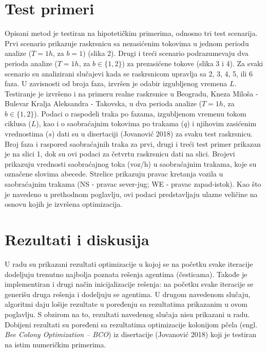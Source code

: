 \section{Test primeri}

Opisani metod je testiran na hipotetičkim primerima, odnosno tri test scenarija. Prvi scenario prikazuje raskrsnicu sa nezasićenim tokovima u jednom periodu analize ($T=1h$, za $b = 1$) (slika 2). Drugi i treći scenario podrazumevaju dva perioda analize ($T=1h$, za $b\in\{1,2\}$) za prezasićene tokove (slika 3 i 4). Za svaki scenario su analizirani slučajevi kada se raskrsnicom upravlja sa 2, 3, 4, 5, ili 6 faza. U zavisnosti od broja faza, izvršen je odabir izgubljenog vremena $L$. Testiranje je izvršeno i na primeru realne raskrsnice u Beogradu, Kneza Miloša - Bulevar Kralja Aleksandra - Takovska, u dva perioda analize  ($T=1h$, za $b\in\{1,2\}$). Podaci o raspodeli traka po fazama, izgubljenom vremenu tokom ciklusa ($L$), kao i o saobraćajnim tokovima po trakama ($q$) i njihovim zasićenim vrednostima ($s$) dati su u disertaciji (Jovanović 2018) za svaku test raskrsnicu. Broj faza i raspored saobraćajnih traka za prvi, drugi i treći test primer prikazan je na slici 1, dok su ovi podaci za četvrtu raskrsnicu dati na slici. Brojevi prikazuju vrednosti saobraćajnog toka (voz/h) u saobraćajnim trakama, koje su označene slovima abecede. Strelice prikazuju pravac kretanja vozila u saobraćajnim trakama (NS - pravac sever-jug; WE - pravac zapad-istok). Kao što je navedeno u prethodnom poglavlju, ovi podaci predstavljaju ulazne veličine na osnovu kojih je izvršena optimizacija.


\section{Rezultati i diskusija}

U radu su prikazani rezultati optimizacije u kojoj se na početku svake iteracije dodeljuju trenutno najbolja poznata rešenja agentima (česticama). Takođe je implementiran i drugi način inicijalizacije rešenja: na početku svake iteracije se generišu druga rešenja i dodeljuju se agentima. U drugom navedenom slučaju, algoritmi daju lošije rezultate u poređenju sa rezultatima prikazanim u ovom poglavlju. S obzirom na to, rezultati navedenog slučaja nisu prikazani u radu. Dobijeni rezultati su poređeni sa rezultatima optimizacije kolonijom pčela (engl. \emph{Bee Colony Optimization – BCO}) iz disertacije (Jovanović 2018) koji je testiran na istim numeričkim primerima.

